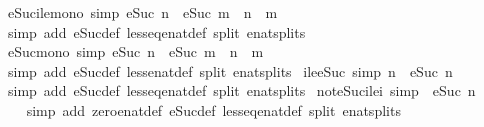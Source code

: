 \begin{isabellebody}
{\isafoldproof}%
%
\isadelimproof
\isanewline
%
\endisadelimproof
\isanewline
{}\isamarkupfalse%
\ eSuc{\isacharunderscore}ile{\isacharunderscore}mono\ {\isacharbrackleft}simp{\isacharbrackright}{\isacharcolon}\ {\isachardoublequoteopen}eSuc\ n\ {\isasymle}\ eSuc\ m\ {\isasymlongleftrightarrow}\ n\ {\isasymle}\ m{\isachardoublequoteclose}\isanewline
%
\isadelimproof
\ \ %
\endisadelimproof
%
\isatagproof
{}\isamarkupfalse%
\ {\isacharparenleft}simp\ add{\isacharcolon}\ eSuc{\isacharunderscore}def\ less{\isacharunderscore}eq{\isacharunderscore}enat{\isacharunderscore}def\ split{\isacharcolon}\ enat{\isachardot}splits{\isacharparenright}%
\endisatagproof
{\isafoldproof}%
%
\isadelimproof
\isanewline
%
\endisadelimproof
\isanewline
{}\isamarkupfalse%
\ eSuc{\isacharunderscore}mono\ {\isacharbrackleft}simp{\isacharbrackright}{\isacharcolon}\ {\isachardoublequoteopen}eSuc\ n\ {\isacharless}\ eSuc\ m\ {\isasymlongleftrightarrow}\ n\ {\isacharless}\ m{\isachardoublequoteclose}\isanewline
%
\isadelimproof
\ \ %
\endisadelimproof
%
\isatagproof
{}\isamarkupfalse%
\ {\isacharparenleft}simp\ add{\isacharcolon}\ eSuc{\isacharunderscore}def\ less{\isacharunderscore}enat{\isacharunderscore}def\ split{\isacharcolon}\ enat{\isachardot}splits{\isacharparenright}%
\endisatagproof
{\isafoldproof}%
%
\isadelimproof
\isanewline
%
\endisadelimproof
\isanewline
{}\isamarkupfalse%
\ ile{\isacharunderscore}eSuc\ {\isacharbrackleft}simp{\isacharbrackright}{\isacharcolon}\ {\isachardoublequoteopen}n\ {\isasymle}\ eSuc\ n{\isachardoublequoteclose}\isanewline
%
\isadelimproof
\ \ %
\endisadelimproof
%
\isatagproof
{}\isamarkupfalse%
\ {\isacharparenleft}simp\ add{\isacharcolon}\ eSuc{\isacharunderscore}def\ less{\isacharunderscore}eq{\isacharunderscore}enat{\isacharunderscore}def\ split{\isacharcolon}\ enat{\isachardot}splits{\isacharparenright}%
\endisatagproof
{\isafoldproof}%
%
\isadelimproof
\isanewline
%
\endisadelimproof
\isanewline
{}\isamarkupfalse%
\ not{\isacharunderscore}eSuc{\isacharunderscore}ilei{}\ {\isacharbrackleft}simp{\isacharbrackright}{\isacharcolon}\ {\isachardoublequoteopen}{\isasymnot}\ eSuc\ n\ {\isasymle}\ {}{\isachardoublequoteclose}\isanewline
%
\isadelimproof
\ \ %
\endisadelimproof
%
\isatagproof
{}\isamarkupfalse%
\ {\isacharparenleft}simp\ add{\isacharcolon}\ zero{\isacharunderscore}enat{\isacharunderscore}def\ eSuc{\isacharunderscore}def\ less{\isacharunderscore}eq{\isacharunderscore}enat{\isacharunderscore}def\ split{\isacharcolon}\ enat{\isachardot}splits{\isacharparenright}%

\end{isabellebody}
